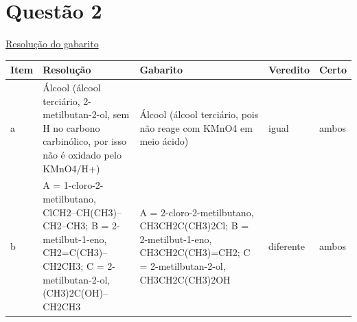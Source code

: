 \documentclass{article}%
\begin{document}
\section*{Questão 2}%
\href{https://poliedroresolve.sistemapoliedro.com.br/vestibulares/ime/2026/ime-2-fase-dia-3-25-10-2025-2-fase-dia-3/dissertativa-2-quimica-2-fase-dia-3-ime-2026}{Resolução do gabarito}\par\smallskip%
\begin{longtable}{@{}p{} p{} p{} p{} p{}@{}}\toprule Item & Resolução & Gabarito & Veredito & Certo \\ \midrule
a & Álcool (álcool terciário, 2{-}metilbutan{-}2{-}ol, sem H no carbono carbinólico, por isso não é oxidado pelo KMnO4/H+) & Álcool (álcool terciário, pois não reage com KMnO4 em meio ácido) & igual & ambos \\
b & A = 1{-}cloro{-}2{-}metilbutano, ClCH2--CH(CH3)--CH2--CH3; B = 2{-}metilbut{-}1{-}eno, CH2=C(CH3)--CH2CH3; C = 2{-}metilbutan{-}2{-}ol, (CH3)2C(OH)--CH2CH3 & A = 2{-}cloro{-}2{-}metilbutano, CH3CH2C(CH3)2Cl; B = 2{-}metilbut{-}1{-}eno, CH3CH2C(CH3)=CH2; C = 2{-}metilbutan{-}2{-}ol, CH3CH2C(CH3)2OH & diferente & ambos \\
\bottomrule\end{longtable}%
\end{document}
